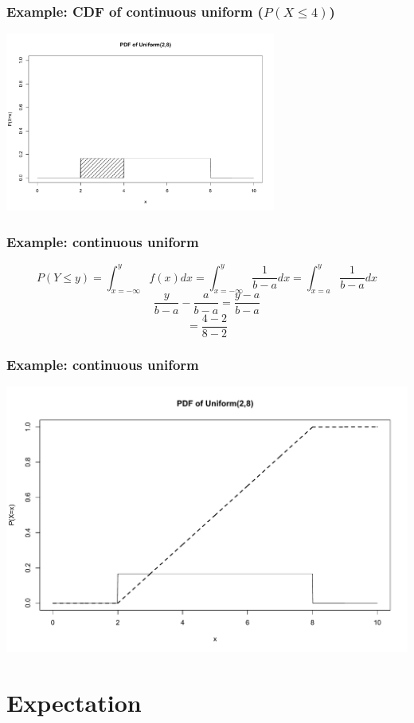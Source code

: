 \documentclass[aspectratio=169, handout]{beamer}
\numberwithin{equation}{section}
\begin{document}
\begin{frame}
\frametitle{Example: CDF of continuous uniform ($P(X\leq4)$)}
\begin{center}
\includegraphics[width=3.5in]{Udists3.pdf}
\end{center}

\end{frame}




\begin{frame}
\frametitle{Example: continuous uniform}

$$P(Y\leq y)=\int_{x=-\infty}^{y}f(x)dx=\int_{x=-\infty}^{y}\frac{1}{b-a}dx=\int_{x=a}^{y}\frac{1}{b-a}dx$$\pause
$$\frac{y}{b-a}-\frac{a}{b-a}=\frac{y-a}{b-a}$$\pause
 $$=\frac{4-2}{8-2}$$

\end{frame}



\begin{frame}
\frametitle{Example: continuous uniform}
\begin{center}
\includegraphics[width=3.5 in]{Udists4.pdf}
\end{center}

\end{frame}



\section{Expectation}
\end{document}
